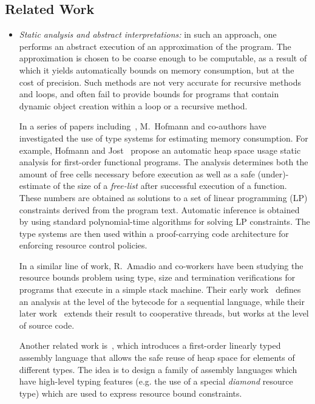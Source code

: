 \subsection{Related Work}\label{sec:rel}
\begin{itemize}
\item \emph{Static analysis and abstract interpretations:} in such an
approach, one performs an abstract execution of an approximation of
the program. The approximation is chosen to be coarse enough to be
computable, as a result of which it yields automatically bounds on
memory consumption, but at the cost of precision. Such methods are not
very accurate for recursive methods and loops, and often fail to
provide bounds for programs that contain dynamic object creation
within a loop or a recursive method.

In a series of papers including~\cite{asp+04:cassis}, M.~Hofmann and
co-authors have investigated the use of type systems for estimating
memory consumption. For example, Hofmann and Jost~\cite{HJ03sph}
propose an automatic heap space usage static analysis for first-order
functional programs. The analysis determines both the amount of free
cells necessary before execution as well as a safe (under)-estimate of
the size of a \emph{free-list} after successful execution of a
function.  These numbers are obtained as solutions to a set of linear
programming (LP) constraints derived from the program text. Automatic
inference is obtained by using standard polynomial-time algorithms for
solving LP constraints. The type systems are then used within a
proof-carrying code architecture for enforcing resource control
policies.


In a similar line of work, R.~Amadio and co-workers have been studying
the resource bounds problem using type, size and termination
verifications for programs that execute in a simple stack machine.
Their early work~\cite{schneider04cba} defines an analysis at the
level of the bytecode for a sequential language, while their later
work~\cite{ADZ04:concur} extends their result to cooperative threads,
but works at the level of source code.


Another related work is~\cite{AC03hba}, which introduces a first-order
linearly typed assembly language that allows the safe reuse of heap
space for elements of different types. The idea is to design a family
of assembly languages which have high-level typing features (e.g. the
use of a special {\em diamond} resource type) which are used to
express resource bound constraints.


\end{itemize}
